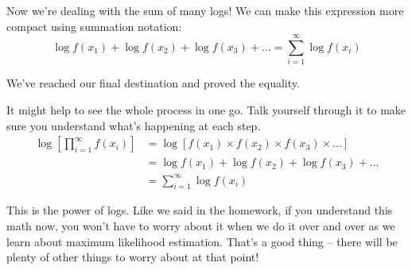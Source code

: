 \documentclass[12pt]{article}
\begin{document}
Now we're dealing with the sum of many logs! We can make this expression more compact using summation notation:
$$\log f(x_1) + \log f(x_2) + \log f(x_3) + ... = \sum_{i=1}^\infty \log f(x_i)$$

We've reached our final destination and proved the equality.

It might help to see the whole process in one go. Talk yourself through it to make sure you understand what's happening at each step.
\begin{align*}
\log \left[\prod_{i=1}^{\infty} f(x_i)\right] &= \log \left[f(x_1) \times f(x_2) \times f(x_3) \times ...\right]\\
&= \log f(x_1) + \log f(x_2) + \log f(x_3) + ...\\
&= \sum_{i=1}^\infty \log f(x_i)
\end{align*}

This is the power of logs. Like we said in the homework, if you understand this math now, you won't have to worry about it when we do it over and over as we learn about maximum likelihood estimation. That's a good thing -- there will be plenty of other things to worry about at that point!
\end{document}
